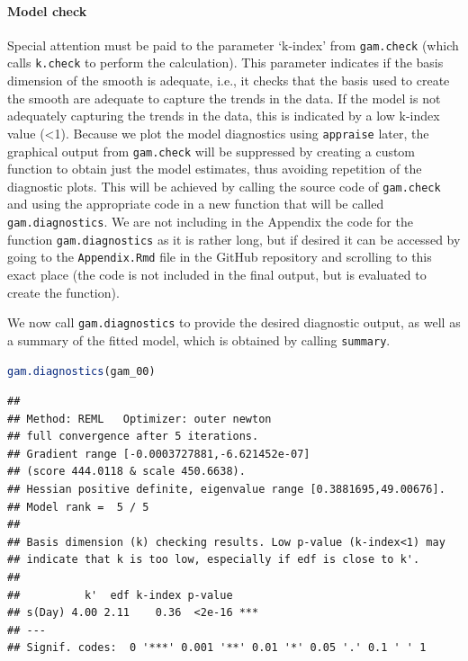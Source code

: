 \documentclass[
]{article}
\newcommand{\passthrough}[1]{#1}
\begin{document}
\hypertarget{gam-00-model-check}{%
\paragraph{Model check}\label{gam-00-model-check}}

Special attention must be paid to the parameter `k-index' from \passthrough{\lstinline!gam.check!} (which calls \passthrough{\lstinline!k.check!} to perform the calculation). This parameter indicates if the basis dimension of the smooth is adequate, i.e., it checks that the basis used to create the smooth are adequate to capture the trends in the data. If the model is not adequately capturing the trends in the data, this is indicated by a low k-index value (\textless1). Because we plot the model diagnostics using \passthrough{\lstinline!appraise!} later, the graphical output from \passthrough{\lstinline!gam.check!} will be suppressed by creating a custom function to obtain just the model estimates, thus avoiding repetition of the diagnostic plots. This will be achieved by calling the source code of \passthrough{\lstinline!gam.check!} and using the appropriate code in a new function that will be called \passthrough{\lstinline!gam.diagnostics!}. We are not including in the Appendix the code for the function \passthrough{\lstinline!gam.diagnostics!} as it is rather long, but if desired it can be accessed by going to the \passthrough{\lstinline!Appendix.Rmd!} file in the GitHub repository and scrolling to this exact place (the code is not included in the final output, but is evaluated to create the function).

We now call \passthrough{\lstinline!gam.diagnostics!} to provide the desired diagnostic output, as well as a summary of the fitted model, which is obtained by calling \passthrough{\lstinline!summary!}.

\begin{lstlisting}[language=R]
gam.diagnostics(gam_00)
\end{lstlisting}

\begin{lstlisting}
## 
## Method: REML   Optimizer: outer newton
## full convergence after 5 iterations.
## Gradient range [-0.0003727881,-6.621452e-07]
## (score 444.0118 & scale 450.6638).
## Hessian positive definite, eigenvalue range [0.3881695,49.00676].
## Model rank =  5 / 5 
## 
## Basis dimension (k) checking results. Low p-value (k-index<1) may
## indicate that k is too low, especially if edf is close to k'.
## 
##          k'  edf k-index p-value    
## s(Day) 4.00 2.11    0.36  <2e-16 ***
## ---
## Signif. codes:  0 '***' 0.001 '**' 0.01 '*' 0.05 '.' 0.1 ' ' 1
\end{lstlisting}
\end{document}
